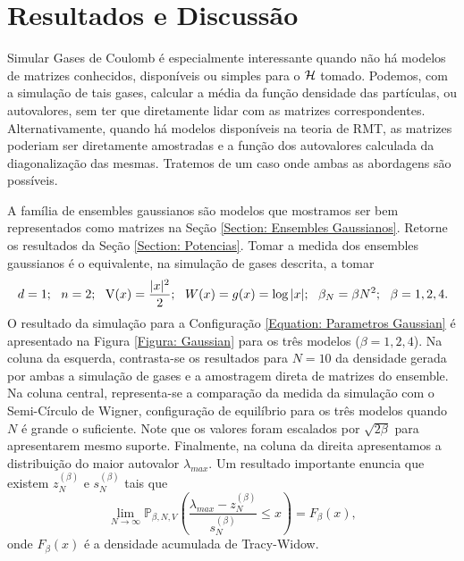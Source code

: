 \section{Resultados e Discussão}

Simular Gases de Coulomb é especialmente interessante quando não há modelos de matrizes conhecidos, disponíveis ou simples para o $\operatorname{\mathcal{H}}$ tomado. Podemos, com a simulação de tais gases, calcular a média da função densidade das partículas, ou autovalores, sem ter que diretamente lidar com as matrizes correspondentes. Alternativamente, quando há modelos disponíveis na teoria de RMT, as matrizes poderiam ser diretamente amostradas e a função dos autovalores calculada da diagonalização das mesmas. Tratemos de um caso onde ambas as abordagens são possíveis.

A família de ensembles gaussianos são modelos que mostramos ser bem representados como matrizes na Seção \ref{Section: Ensembles Gaussianos}. Retorne os resultados da Seção \ref{Section: Potencias}. Tomar a medida dos ensembles gaussianos é o equivalente, na simulação de gases descrita, a tomar 
\begin{equation}
d = 1; \ \  n = 2; \ \ \V(x)=\frac{|x|^2}{2}; \ \ W(x) = g(x) = \log{|x|}; \ \ \beta_N = \beta N^2; \ \ \beta = 1,2,4.
\label{Equation: Parametros Gaussian}
\end{equation}
O resultado da simulação para a Configuração \eqref{Equation: Parametros Gaussian} é apresentado na Figura \ref{Figura: Gaussian} para os três modelos ($\beta = 1,2,4$). Na coluna da esquerda, contrasta-se os resultados para $N=10$ da densidade gerada por ambas a simulação de gases e a amostragem direta de matrizes do ensemble. Na coluna central, representa-se a comparação da medida da simulação com o Semi-Círculo de Wigner, configuração de equilíbrio para os três modelos quando $N$ é grande o suficiente. Note que os valores foram escalados por $\sqrt{2 \beta}$ para apresentarem mesmo suporte. Finalmente, na coluna da direita apresentamos a distribuição do maior autovalor $\lambda_{max}$. Um resultado importante enuncia que existem $z_{N}^{(\beta)}$ e $s_N^{(\beta)}$ tais que $$\lim_{N \to \infty} \mathbb{P}_{\beta,N,V} \left( \frac{\lambda_{max} - z_{N}^{(\beta)}}{s_N^{(\beta)}} \leq x \right) = F_{\beta}(x),$$ onde $F_{\beta}(x)$ é a densidade acumulada de Tracy-Widow. \cite{Tracy} 

